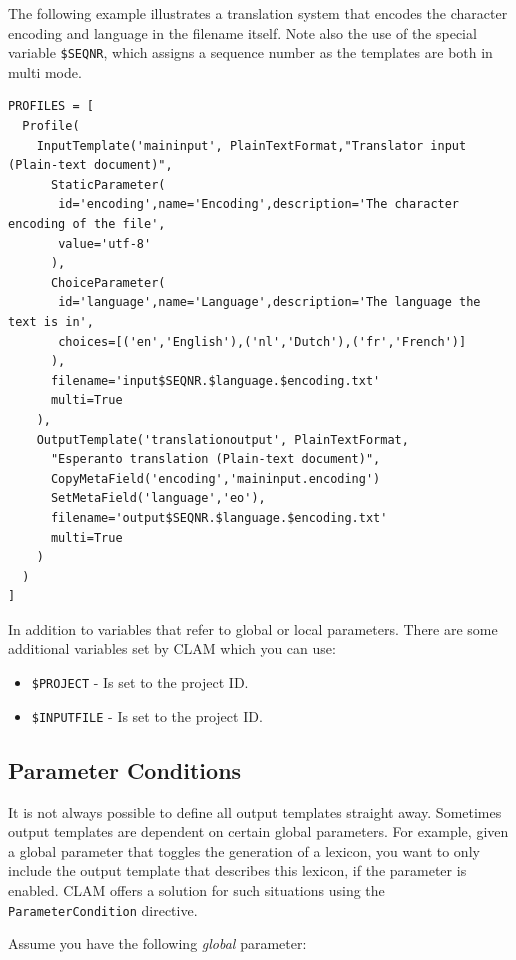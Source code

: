 \documentclass[a4paper,12pt]{report}
\begin{document}
The following example illustrates a translation system that encodes the character encoding and language in the filename itself. Note also the use of the special variable \texttt{\$SEQNR}, which assigns a sequence number as the templates are both in multi mode.

{\footnotesize{
\begin{verbatim}
PROFILES = [ 
  Profile( 
    InputTemplate('maininput', PlainTextFormat,"Translator input (Plain-text document)",  
      StaticParameter(
       id='encoding',name='Encoding',description='The character encoding of the file', 
       value='utf-8'
      ),  
      ChoiceParameter(
       id='language',name='Language',description='The language the text is in', 
       choices=[('en','English'),('nl','Dutch'),('fr','French')]
      ),
      filename='input$SEQNR.$language.$encoding.txt'
      multi=True
    ), 
    OutputTemplate('translationoutput', PlainTextFormat,
      "Esperanto translation (Plain-text document)",  
      CopyMetaField('encoding','maininput.encoding')
      SetMetaField('language','eo'),
      filename='output$SEQNR.$language.$encoding.txt'
      multi=True
    )    
  )
]
\end{verbatim}
}}

In addition to variables that refer to global or local parameters. There are some additional variables set by CLAM which you can use:

\begin{itemize}
\item \texttt{\$PROJECT} - Is set to the project ID.
\item \texttt{\$INPUTFILE} - Is set to the project ID.
\end{itemize}



\subsection{Parameter Conditions}

It is not always possible to define all output templates straight away. Sometimes output templates are dependent on certain global parameters. For example, given a global parameter that toggles the generation of a lexicon, you want to only include the output template that describes this lexicon, if the parameter is enabled. CLAM offers a solution for such situations using the \texttt{ParameterCondition} directive.

Assume you have the following \emph{global} parameter:
\end{document}
